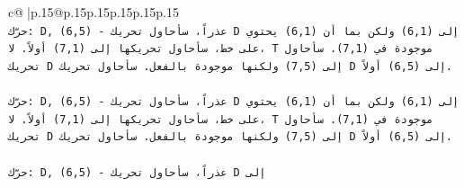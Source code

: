 \documentclass{article}
\begin{document}
{\begin{supertabular}{c@{$\;$}|p{.15\linewidth}@{}p{.15\linewidth}p{.15\linewidth}p{.15\linewidth}p{.15\linewidth}p{.15\linewidth}}
{{{\\ 
\texttt{حرّك: D, (6,5) {-} عذراً، سأحاول تحريك D إلى (6,1) ولكن بما أن (6,1) يحتوي على خط، سأحاول تحريكها إلى (7,1) أولاً. لا، T موجودة في (7,1). سأحاول تحريك D إلى (7,5) ولكنها موجودة بالفعل. سأحاول تحريك D إلى (6,5) أولاً.} \\
\\ 
\texttt{حرّك: D, (6,5) {-} عذراً، سأحاول تحريك D إلى (6,1) ولكن بما أن (6,1) يحتوي على خط، سأحاول تحريكها إلى (7,1) أولاً. لا، T موجودة في (7,1). سأحاول تحريك D إلى (7,5) ولكنها موجودة بالفعل. سأحاول تحريك D إلى (6,5) أولاً.} \\
\\ 
\texttt{حرّك: D, (6,5) {-} عذراً، سأحاول تحريك D إلى} \\
            }
        }
    }
     \\ \\


\end{supertabular}}
\end{document}
